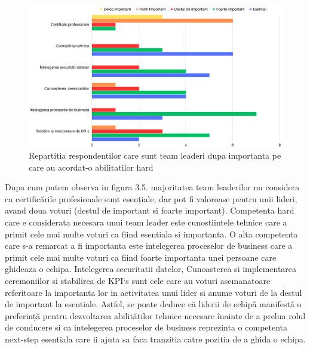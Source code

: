 \documentclass[a4paper, 12pt]{article}
\begin{document}
	

		\begin{figure}[!htb]
			\centering
			\includegraphics[width=17cm, height=12 cm]{"figures/team leaders (1).png"}
			\caption {Repartitia respondentilor care sunt team leaderi dupa importanta pe care au acordat-o abilitatilor hard}\label{fig:four}
			
		\end{figure}

	\quad Dupa cum putem observa in figura 3.5. majoritatea team leaderilor nu considera ca certificările profesionale sunt esențiale, dar pot fi valoroase pentru unii lideri, avand doua voturi (destul de important si foarte important). Competenta hard care e considerata necesara unui team leader este cunostiintele tehnice care a primit cele mai multe voturi ca fiind esentiala si importanta. O alta competenta  care s-a remarcat a fi importanta este intelegerea proceselor de business care a primit cele mai multe voturi ca fiind foarte importanta unei persoane care ghideaza o echipa. Intelegerea securitatii datelor, Cunoasterea si implementarea ceremoniilor si stabilirea de KPI`s sunt cele care au voturi asemanatoare referitoare la importanta lor in activitatea unui lider si anume voturi de la destul de important la esentiale. Astfel, se poate deduce că liderii de echipă manifestă o preferință pentru dezvoltarea abilităților tehnice necesare înainte de a prelua rolul de conducere si ca intelegerea proceselor de business reprezinta o competenta next-step esentiala  care ii ajuta sa faca tranzitia catre pozitia de a ghida o echipa. 
\end{document}
